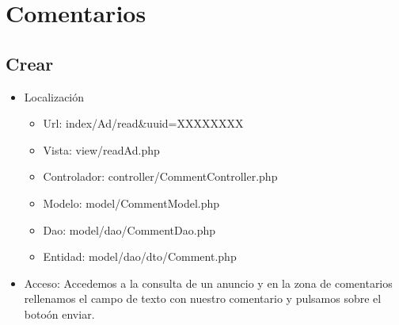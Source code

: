 \section{Comentarios}

\subsection{Crear}
\begin{itemize}
\item Localizaci\'{o}n
\begin{itemize}
\item Url: index/Ad/read\&uuid=XXXXXXXX
\item Vista: view/readAd.php
\item Controlador: controller/CommentController.php
\item Modelo: model/CommentModel.php
\item Dao: model/dao/CommentDao.php
\item Entidad: model/dao/dto/Comment.php
\end{itemize}
\item Acceso: Accedemos a la consulta de un anuncio y en la zona de comentarios rellenamos el campo de texto con nuestro comentario y pulsamos sobre el boto\'{o}n enviar. 
\end{itemize}
